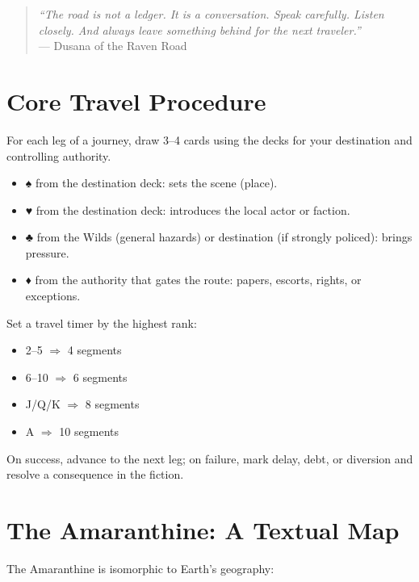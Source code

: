\documentclass[12pt,oneside]{book}
\renewcommand{\spadesuit}{♠}
\renewcommand{\heartsuit}{♥}
\renewcommand{\clubsuit}{♣}
\renewcommand{\diamondsuit}{♦}
\begin{document}
\begin{quote}
\small
\textit{``The road is not a ledger. It is a conversation. Speak carefully. Listen closely. And always leave something behind for the next traveler.''} \\
--- Dusana of the Raven Road
\end{quote}

\section{Core Travel Procedure}

For each leg of a journey, draw 3--4 cards using the decks for your destination and controlling authority.

\begin{itemize}
\item \spadesuit{} from the destination deck: sets the scene (place).
\item \heartsuit{} from the destination deck: introduces the local actor or faction.
\item \clubsuit{} from the Wilds (general hazards) or destination (if strongly policed): brings pressure.
\item \diamondsuit{} from the authority that gates the route: papers, escorts, rights, or exceptions.
\end{itemize}

Set a travel timer by the highest rank:
\begin{itemize}
\item 2--5 $\Rightarrow$ 4 segments
\item 6--10 $\Rightarrow$ 6 segments
\item J/Q/K $\Rightarrow$ 8 segments
\item A $\Rightarrow$ 10 segments
\end{itemize}

On success, advance to the next leg; on failure, mark delay, debt, or diversion and resolve a consequence in the fiction.

\section{The Amaranthine: A Textual Map}

The Amaranthine is isomorphic to Earth's geography:
\end{document}
